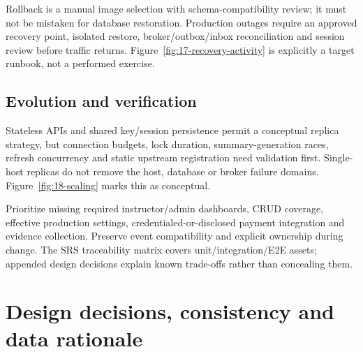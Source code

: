 \documentclass[10pt,a4paper]{article}
\begin{document}
Rollback is a manual image selection with schema-compatibility review; it must not
be mistaken for database restoration. Production outages require an approved
recovery point, isolated restore, broker/outbox/inbox reconciliation and session
review before traffic returns. Figure~\ref{fig:17-recovery-activity} is explicitly
a target runbook, not a performed exercise.

\subsection{Evolution and verification}
Stateless APIs and shared key/session persistence permit a conceptual replica
strategy, but connection budgets, lock duration, summary-generation races, refresh
concurrency and static upstream registration need validation first.
Single-host replicas do not remove the host, database or broker failure domains.
Figure~\ref{fig:18-scaling} marks this as conceptual.

Prioritize missing required instructor/admin dashboards, CRUD coverage, effective
production settings, credentialed-or-disclosed payment integration and evidence
collection. Preserve event compatibility and explicit ownership during change.
The SRS traceability matrix covers unit/integration/E2E assets; appended design
decisions explain known trade-offs rather than concealing them.

\clearpage
\appendix
\section{Design decisions, consistency and data rationale}\label{app:decisions}
\end{document}

